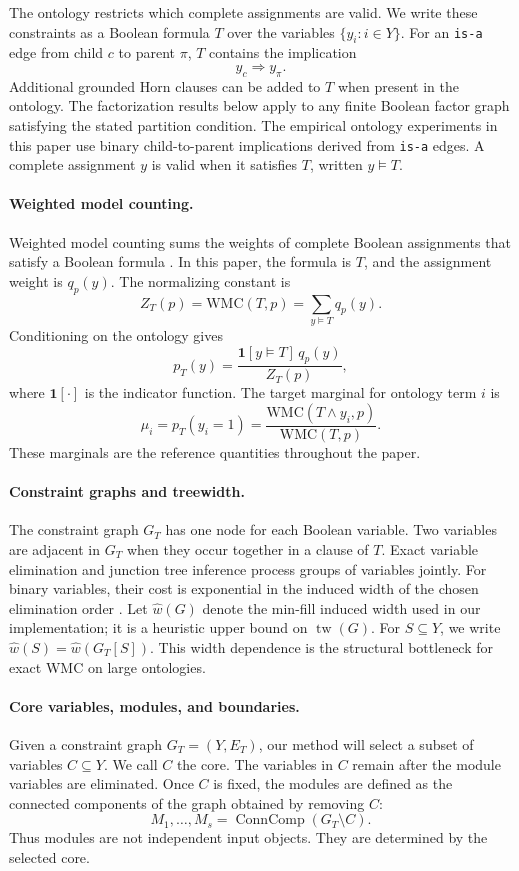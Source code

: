 \documentclass[letterpaper]{article}
\begin{document}
The ontology restricts which complete assignments are valid. We write
these constraints as a Boolean formula \(T\) over the variables
\(\{y_i:i\in Y\}\). For an \texttt{is-a} edge from child \(c\) to
parent \(\pi\), \(T\) contains the implication
\[
y_c \Rightarrow y_\pi .
\]
Additional grounded Horn clauses can be added to \(T\) when present in
the ontology. The factorization results below apply to any finite Boolean
factor graph satisfying the stated partition condition. The empirical
ontology experiments in this paper use binary child-to-parent
implications derived from \texttt{is-a} edges. A complete assignment
\(y\) is valid when it satisfies \(T\), written \(y\models T\).

\paragraph{Weighted model counting.}
Weighted model counting sums the weights of complete Boolean assignments
that satisfy a Boolean formula \citep{chavira2008wmc}. In this paper,
the formula is \(T\), and the assignment weight is \(q_p(y)\). The
normalizing constant is
\[
Z_T(p)
=
\mathrm{WMC}(T,p)
=
\sum_{y\models T} q_p(y).
\]
Conditioning on the ontology gives
\[
p_T(y)
=
\frac{\mathbf{1}[y\models T]\,q_p(y)}
     {Z_T(p)},
\]
where \(\mathbf{1}[\cdot]\) is the indicator function. The target
marginal for ontology term \(i\) is
\[
\mu_i
=
p_T(y_i=1)
=
\frac{\mathrm{WMC}(T\wedge y_i,p)}
     {\mathrm{WMC}(T,p)}.
\]
These marginals are the reference quantities throughout the paper.

\paragraph{Constraint graphs and treewidth.}
The constraint graph \(G_T\) has one node for each Boolean variable. Two
variables are adjacent in \(G_T\) when they occur together in a clause
of \(T\). Exact variable elimination and junction tree inference process
groups of variables jointly. For binary variables, their cost is
exponential in the induced width of the chosen elimination order
\citep{pearl1988probabilistic,bodlaender1993treewidth}. Let
\(\widehat w(G)\) denote the min-fill induced width used in our
implementation; it is a heuristic upper bound on
\(\operatorname{tw}(G)\). For \(S\subseteq Y\), we write
\(\widehat w(S)=\widehat w(G_T[S])\). This width dependence is the
structural bottleneck for exact WMC on large ontologies.

\paragraph{Core variables, modules, and boundaries.}
Given a constraint graph \(G_T=(Y,E_T)\), our method will select a subset
of variables \(C\subseteq Y\). We call \(C\) the core. The variables in
\(C\) remain after the module variables are eliminated. Once \(C\) is fixed,
the modules are defined as the connected components of the graph obtained
by removing \(C\):
\[
M_1,\ldots,M_s
=
\operatorname{ConnComp}(G_T\setminus C).
\]
Thus modules are not independent input objects. They are determined by
the selected core.
\end{document}
